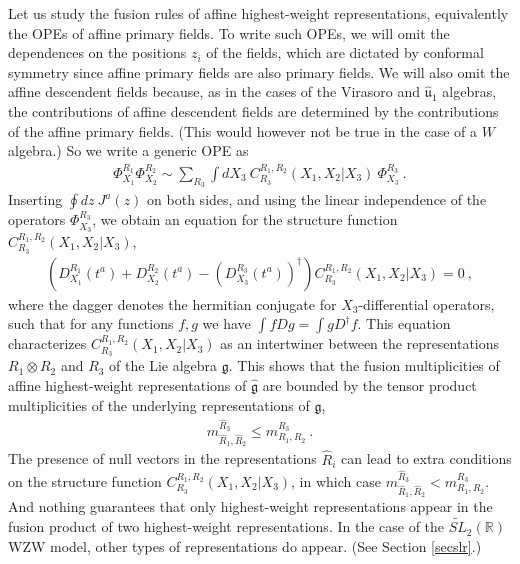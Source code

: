 \documentclass[12pt, a4paper, notitlepage, twoside]{report}
\numberwithin{equation}{section}
\theoremstyle{break}
\begin{document}
Let us study the fusion rules of affine highest-weight representations, equivalently the OPEs of affine primary fields.
To write such OPEs, we will omit the dependences on the positions $z_i$ of the fields, which are dictated by conformal symmetry since affine primary fields are also primary fields.
We will also omit the affine descendent fields because, as in the cases of the Virasoro and $\hat{\mathfrak{u}}_1$ algebras, the contributions of affine descendent fields are determined by the contributions of the affine primary fields. (This would however not be true in the case of a $W$ algebra.) So we write a generic OPE as 
\begin{align}
 \Phi^{R_1}_{X_1}\Phi^{R_2}_{X_2} \sim \sum_{R_3} \int dX_3\ C^{R_1,R_2}_{R_3}(X_1,X_2|X_3)\ \Phi^{R_3}_{X_3}\ .
\end{align}
Inserting $\oint dz\ J^a(z)$ on both sides, and using the linear independence of the operators $\Phi^{R_3}_{X_3}$, we obtain an equation for the structure function $C^{R_1,R_2}_{R_3}(X_1,X_2|X_3)$,
\begin{align}
 \left(D_{X_1}^{R_1}(t^a)+D_{X_2}^{R_2}(t^a)-\left(D_{X_3}^{R_3}(t^a)\right)^\dagger\right) C^{R_1,R_2}_{R_3}(X_1,X_2|X_3) = 0\ ,
\label{dddc}
\end{align}
where the dagger denotes the hermitian conjugate for $X_3$-differential operators, such that for any functions $f,g$ we have 
$\int fDg =\int g D^\dagger f$.
This equation characterizes $C^{R_1,R_2}_{R_3}(X_1,X_2|X_3)$ as an intertwiner between the representations $R_1\otimes R_2$ and $R_3$ of the Lie algebra $\mathfrak{g}$.
This shows that the fusion multiplicities of affine highest-weight representations of $\hat{\mathfrak{g}}$ are bounded by the tensor product multiplicities of the underlying representations of $\mathfrak{g}$, 
\begin{align}
 m_{\hat{R}_1,\hat{R}_2}^{\hat{R}_3} \leq m_{R_1,R_2}^{R_3}\ .
\end{align}
The presence of null vectors in the representations $\hat{R}_i$ can lead to extra conditions on the structure function $C^{R_1,R_2}_{R_3}(X_1,X_2|X_3)$, in which case $m_{\hat{R}_1,\hat{R}_2}^{\hat{R}_3} < m_{R_1,R_2}^{R_3}$. 
And nothing guarantees that only highest-weight representations appear in the fusion product of two highest-weight representations. 
In the case of the $\widetilde{SL}_2(\mathbb{R})$ WZW model, other types of representations do appear. (See Section \ref{secslr}.) 
\end{document}
